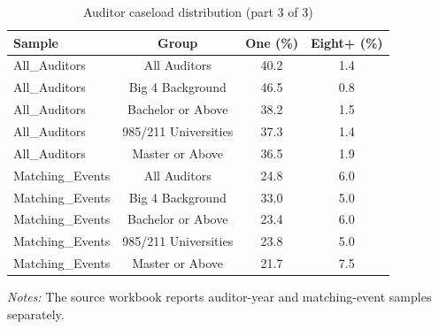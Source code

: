 \begin{table}[htbp]
\footnotesize
\centering
\caption{Auditor caseload distribution (part 3 of 3)}
\begin{threeparttable}
\begin{tabular}{p{}ccc}
\toprule
Sample & Group & One (\%) & Eight+ (\%) \\
\midrule
All\_Auditors & All Auditors & 40.2 & 1.4 \\
All\_Auditors & Big 4 Background & 46.5 & 0.8 \\
All\_Auditors & Bachelor or Above & 38.2 & 1.5 \\
All\_Auditors & 985/211 Universities & 37.3 & 1.4 \\
All\_Auditors & Master or Above & 36.5 & 1.9 \\
Matching\_Events & All Auditors & 24.8 & 6.0 \\
Matching\_Events & Big 4 Background & 33.0 & 5.0 \\
Matching\_Events & Bachelor or Above & 23.4 & 6.0 \\
Matching\_Events & 985/211 Universities & 23.8 & 5.0 \\
Matching\_Events & Master or Above & 21.7 & 7.5 \\
\bottomrule
\end{tabular}
\begin{tablenotes}\footnotesize
\item \raggedright \textit{Notes:} The source workbook reports auditor-year and matching-event samples separately.
\end{tablenotes}
\end{threeparttable}
\end{table}
